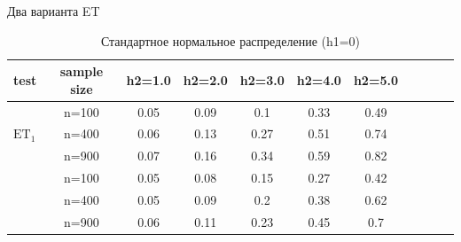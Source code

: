 \documentclass[handout]{beamer}
\begin{document}
\begin{frame}{Два варианта ET}
	\begin{table}[!h]
		\centering
		\caption{Стандартное нормальное распределение (h1=0)}
		\hspace*{-0.6cm}\begin{tabular}{l c c c c c c c c c c} 
			\toprule
			test & sample size & h2=1.0  & h2=2.0  & h2=3.0 & h2=4.0  & h2=5.0 \\ 
			\midrule
			\multirow{3}{*}{$\text{ET}_1$} 
			& n=100 & 0.05 & 0.09 & 0.1 & 0.33 & 0.49 \\ 
			& n=400 & 0.06& 0.13 & 0.27& 0.51  & 0.74 \\ 
			& n=900 & 0.07 & 0.16  & 0.34 & 0.59 & 0.82 \\ 
			\addlinespace
			\addlinespace
			\multirow{3}{*}{$\text{ET}_2$} 
			& n=100 & 0.05  & 0.08 & 0.15 & 0.27  & 0.42 \\ 
			& n=400 & 0.05  & 0.09  & 0.2  & 0.38  & 0.62 \\ 
			& n=900 & 0.06  & 0.11  & 0.23 & 0.45 & 0.7 \\ 
			\bottomrule
		\end{tabular}
		\label{tbl:et_comp_normal_h2}
	\end{table}
\end{frame}
\end{document}
